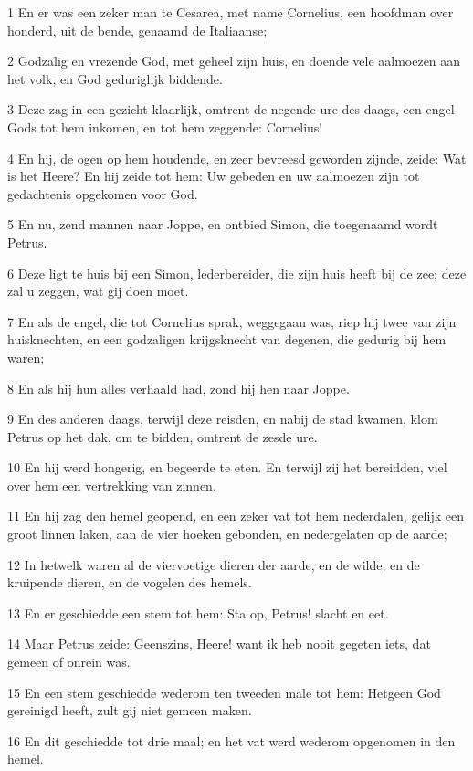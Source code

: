 \par 1 En er was een zeker man te Cesarea, met name Cornelius, een hoofdman over honderd, uit de bende, genaamd de Italiaanse;
\par 2 Godzalig en vrezende God, met geheel zijn huis, en doende vele aalmoezen aan het volk, en God geduriglijk biddende.
\par 3 Deze zag in een gezicht klaarlijk, omtrent de negende ure des daags, een engel Gods tot hem inkomen, en tot hem zeggende: Cornelius!
\par 4 En hij, de ogen op hem houdende, en zeer bevreesd geworden zijnde, zeide: Wat is het Heere? En hij zeide tot hem: Uw gebeden en uw aalmoezen zijn tot gedachtenis opgekomen voor God.
\par 5 En nu, zend mannen naar Joppe, en ontbied Simon, die toegenaamd wordt Petrus.
\par 6 Deze ligt te huis bij een Simon, lederbereider, die zijn huis heeft bij de zee; deze zal u zeggen, wat gij doen moet.
\par 7 En als de engel, die tot Cornelius sprak, weggegaan was, riep hij twee van zijn huisknechten, en een godzaligen krijgsknecht van degenen, die gedurig bij hem waren;
\par 8 En als hij hun alles verhaald had, zond hij hen naar Joppe.
\par 9 En des anderen daags, terwijl deze reisden, en nabij de stad kwamen, klom Petrus op het dak, om te bidden, omtrent de zesde ure.
\par 10 En hij werd hongerig, en begeerde te eten. En terwijl zij het bereidden, viel over hem een vertrekking van zinnen.
\par 11 En hij zag den hemel geopend, en een zeker vat tot hem nederdalen, gelijk een groot linnen laken, aan de vier hoeken gebonden, en nedergelaten op de aarde;
\par 12 In hetwelk waren al de viervoetige dieren der aarde, en de wilde, en de kruipende dieren, en de vogelen des hemels.
\par 13 En er geschiedde een stem tot hem: Sta op, Petrus! slacht en eet.
\par 14 Maar Petrus zeide: Geenszins, Heere! want ik heb nooit gegeten iets, dat gemeen of onrein was.
\par 15 En een stem geschiedde wederom ten tweeden male tot hem: Hetgeen God gereinigd heeft, zult gij niet gemeen maken.
\par 16 En dit geschiedde tot drie maal; en het vat werd wederom opgenomen in den hemel.
